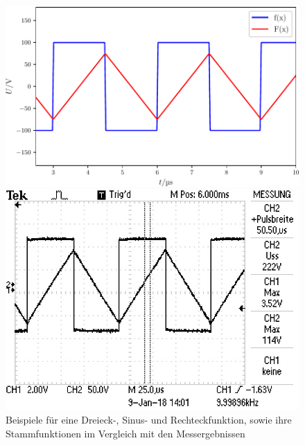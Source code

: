 \begin{figure}
\vspace{2em}
\begin{minipage}{.48\textwidth}
\centering
\includegraphics[width=\linewidth-10pt,height=\textheight-10pt,keepaspectratio]{content/images/Graph7.pdf}
\end{minipage}
\begin{minipage}{0.48\textwidth}
\centering
\includegraphics[width=\linewidth-10pt,height=\textheight-10pt,keepaspectratio]{content/images/7.jpg}
\end{minipage}
\caption{Beispiele für eine Dreieck-, Sinus- und Rechteckfunktion, sowie ihre Stammfunktionen im Vergleich mit den Messergebnissen}
\label{fig:U}
\end{figure}


